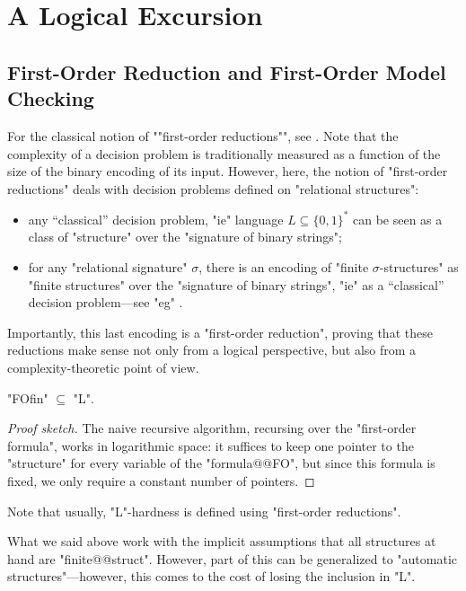 \section{A Logical Excursion}
\label{sec:preliminaries-automatic-structures-logic}

\subsection{First-Order Reduction and First-Order Model Checking}

For the classical notion of \AP""first-order reductions"", see
\cite[Definition 2.11 \& Definition 1.26]{Immerman1998DescriptiveComplexity}.
Note that the complexity of a decision problem is traditionally measured
as a function of the size of the binary encoding of its input.
However, here, the notion of "first-order reductions" deals with
decision problems defined on "relational structures":
\begin{itemize}
	\item any ``classical'' decision problem, "ie" language $L \subseteq \{0,1\}^*$
		can be seen as a class of "structure" over the "signature of binary strings";
	\item for any "relational signature" $\sigma$,
		there is an encoding of "finite $\sigma$-structures" as "finite structures"
		over the "signature of binary strings", "ie" as a ``classical''
		decision problem---see "eg" \cite[\S~2.2]{Immerman1998DescriptiveComplexity}.
\end{itemize}
Importantly, this last encoding is a "first-order reduction", proving that these reductions
make sense not only from a logical perspective, but also from a complexity-theoretic point of
view.

\begin{proposition}[Folklore]
	\label{prop:FO-in-L}
	"FOfin" $\subseteq$ "L".
\end{proposition}

\begin{proof}[Proof sketch]
	The naive recursive algorithm, recursing over the "first-order formula",
	works in logarithmic space: it suffices to keep one pointer to the "structure"
	for every variable of the "formula@@FO", but since this formula is fixed, we only
	require a constant number of pointers.
\end{proof}

Note that usually, "L"-hardness is defined using "first-order reductions".

What we said above work with the implicit assumptions that all structures at hand are 
"finite@@struct". However, part of this can be generalized to "automatic structures"---however, this comes to the cost of losing the inclusion in "L".

